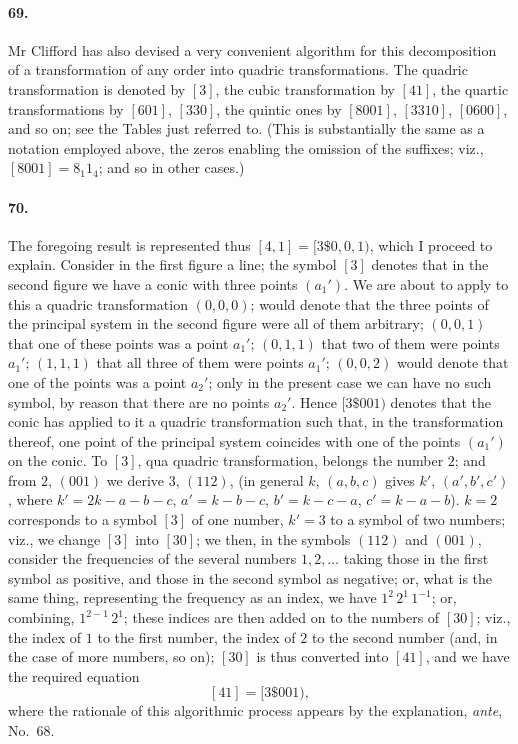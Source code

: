 \documentclass[11pt]{article}
\begin{document}
\medskip

\paragraph{69.}
Mr Clifford has also devised a very convenient algorithm for this
decomposition of a transformation of any order into quadric
transformations. The quadric transformation is denoted by $[3]$, the
cubic transformation by $[41]$, the quartic transformations by
$[601]$, $[330]$, the quintic ones by $[8001]$, $[3310]$, $[0600]$, and
so on; see the Tables just referred to. (This is substantially the same
as a notation employed above, the zeros enabling the omission of the
suffixes; viz., $[8001]=8_{1}1_{4}$; and so in other cases.)

\medskip

\paragraph{70.}
The foregoing result is represented thus
$[4,1]=[3\$\!0,0,1)$, which I proceed to explain. Consider in the first
figure a line; the symbol $[3]$ denotes that in the second figure we have
a conic with three points $(a_{1}')$. We are about to apply to this a
quadric transformation $(0,0,0)$; would denote that the three points of
the principal system in the second figure were all of them arbitrary;
$(0,0,1)$ that one of these points was a point $a_{1}'$; $(0,1,1)$ that
two of them were points $a_{1}'$; $(1,1,1)$ that all three of them were
points $a_{1}'$; $(0,0,2)$ would denote that one of the points was a
point $a_{2}'$; only in the present case we can have no such symbol, by
reason that there are no points $a_{2}'$. Hence $[3\$001)$ denotes that
the conic has applied to it a quadric transformation such that, in the
transformation thereof, one point of the principal system coincides with
one of the points $(a_{1}')$ on the conic. To $[3]$, qua quadric
transformation, belongs the number $2$; and from $2$, $(001)$ we derive
$3$, $(112)$, (in general $k$, $(a,b,c)$ gives $k'$, $(a',b',c')$, where
$k'=2k-a-b-c$, $a'=k-b-c$, $b'=k-c-a$, $c'=k-a-b$). $k=2$ corresponds to
a symbol $[3]$ of one number, $k'=3$ to a symbol of two numbers; viz., we
change $[3]$ into $[30]$; we then, in the symbols $(112)$ and $(001)$,
consider the frequencies of the several numbers $1, 2, \ldots$ taking
those in the first symbol as positive, and those in the second symbol as
negative; or, what is the same thing, representing the frequency as an
index, we have $1^{2}\,2^{1}\,1^{-1}$; or, combining, $1^{2-1}\,2^{1}$;
these indices are then added on to the numbers of $[30]$; viz., the
index of $1$ to the first number, the index of $2$ to the second number
(and, in the case of more numbers, so on); $[30]$ is thus converted into
$[41]$, and we have the required equation
\[
[41] = [3\$001),
\]
where the rationale of this algorithmic process appears by the
explanation, \textit{ante}, No.~$68$.
\end{document}
